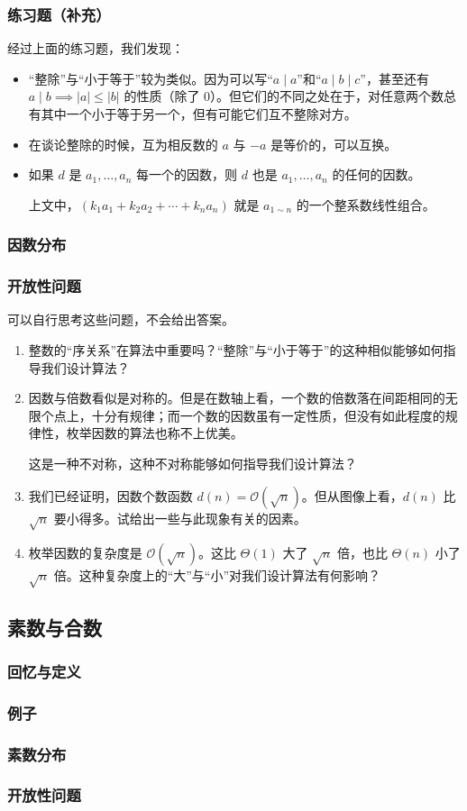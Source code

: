 \begin{frame}
  \frametitle{练习题（补充）}
  经过上面的练习题，我们发现：
  \pause
  \begin{itemize}
    \item “整除”与“小于等于”较为类似。因为可以写“$a \mid a$”和“$a \mid b \mid c$”，甚至还有 $a \mid b \implies \lvert a \rvert \le \lvert b \rvert$ 的性质（除了 $0$）。但它们的不同之处在于，对任意两个数总有其中一个小于等于另一个，但有可能它们互不整除对方。
    \pause
    \item 在谈论整除的时候，互为相反数的 $a$ 与 $-a$ 是等价的，可以互换。
    \pause
    \item 如果 $d$ 是 $a_1, \ldots, a_n$ 每一个的因数，则 $d$ 也是 $a_1, \ldots, a_n$ 的任何的因数。
    
    上文中，$(k_1 a_1 + k_2 a_2 + \cdots + k_n a_n)$ 就是 $a_{1 \sim n}$ 的一个整系数线性组合。
  \end{itemize}
\end{frame}
\begin{frame}
  \frametitle{因数分布}
\end{frame}
\begin{frame}
  \frametitle{开放性问题}
  可以自行思考这些问题，不会给出答案。
  \begin{enumerate}
    \item 整数的“\alert{序关系}”在算法中重要吗？“整除”与“小于等于”的这种相似能够如何指导我们设计算法？
    \item 因数与倍数看似是对称的。但是在数轴上看，一个数的倍数落在间距相同的无限个点上，十分有规律；而一个数的因数虽有一定性质，但没有如此程度的规律性，枚举因数的算法也称不上优美。
    
    这是一种\alert{不对称}，这种不对称能够如何指导我们设计算法？
    \item 我们已经证明，因数个数函数 $d(n) = \mathcal O (\sqrt{n})$。但从图像上看，$d(n)$ 比 $\sqrt{n}$ 要小得多。试给出一些与此现象有关的因素。
    \item 枚举因数的复杂度是 $\mathcal O (\sqrt{n})$。这比 $\Theta(1)$ 大了 $\sqrt{n}$ 倍，也比 $\Theta(n)$ 小了 $\sqrt{n}$ 倍。这种复杂度上的“大”与“小”对我们设计算法有何影响？
  \end{enumerate}
\end{frame}
\subsection{素数与合数}
\begin{frame}[c]
  \progressnow*
\end{frame}
\begin{frame}
  \frametitle{回忆与定义}
\end{frame}
\begin{frame}
  \frametitle{例子}
\end{frame}
\begin{frame}
  \frametitle{素数分布}
\end{frame}
\begin{frame}
  \frametitle{开放性问题}
\end{frame}
